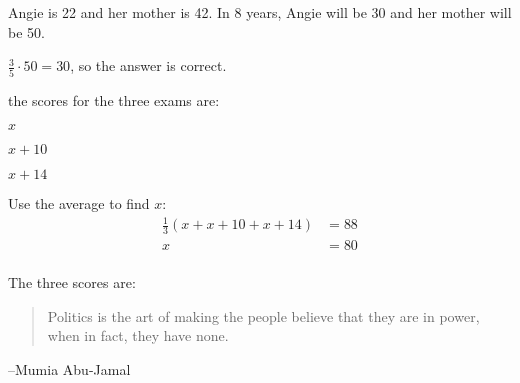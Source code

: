 \documentclass[letterpaper, landscape]{exam}
\begin{document}
\begin{description}
      Angie is 22 and her mother is 42.  In 8 years, Angie will be 30 and her
      mother will be 50.  
      
      $\frac{3}{5} \cdot 50 = 30$, so the answer is correct.

      \item[53] 
        the scores for the three exams are:
        \begin{itemize*}
          \item $x$
          \item $x + 10$
          \item $x + 14$
        \end{itemize*}

        Use the average to find $x$:
        \begin{align*}
          \frac{1}{3} ( x + x + 10 + x + 14 ) & = 88 \\
          x                                   & = 80 \\
        \end{align*}

        The three scores are: 
    \end{description}

  \fi

  \ifprintanswers{}
  \else
    \vspace{10 cm}
    \begin{quote}
      \begin{em}
        Politics is the art of making the people believe that they are in
        power, when in fact, they have none.        
      \end{em}
    \end{quote}
    \hspace{1 cm} --Mumia Abu-Jamal
  \fi
\end{document}
